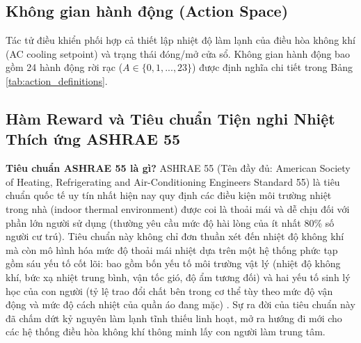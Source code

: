 \documentclass[12pt, a4paper]{report}
\begin{document}
\subsection{Không gian hành động (Action Space)}
Tác tử điều khiển phối hợp cả thiết lập nhiệt độ làm lạnh của điều hòa không khí (AC cooling setpoint) và trạng thái đóng/mở cửa sổ. Không gian hành động bao gồm 24 hành động rời rạc ($A \in \{0, 1, ..., 23\}$) được định nghĩa chi tiết trong Bảng \ref{tab:action_definitions}.

\begin{table}[H]
    \centering
    \caption{Định nghĩa chi tiết 24 hành động trong không gian hành động của tác tử}
    \label{tab:action_definitions}
    \vspace{0.2cm}
\end{table}

\subsection{Hàm Reward và Tiêu chuẩn Tiện nghi Nhiệt Thích ứng ASHRAE 55}
\textbf{Tiêu chuẩn ASHRAE 55 là gì?} 
ASHRAE 55 (Tên đầy đủ: American Society of Heating, Refrigerating and Air-Conditioning Engineers Standard 55) là tiêu chuẩn quốc tế uy tín nhất hiện nay quy định các điều kiện môi trường nhiệt trong nhà (indoor thermal environment) được coi là thoải mái và dễ chịu đối với phần lớn người sử dụng (thường yêu cầu mức độ hài lòng của ít nhất 80\% số người cư trú). Tiêu chuẩn này không chỉ đơn thuần xét đến nhiệt độ không khí mà còn mô hình hóa mức độ thoải mái nhiệt dựa trên một hệ thống phức tạp gồm sáu yếu tố cốt lõi: bao gồm bốn yếu tố môi trường vật lý (nhiệt độ không khí, bức xạ nhiệt trung bình, vận tốc gió, độ ẩm tương đối) và hai yếu tố sinh lý học của con người (tỷ lệ trao đổi chất bên trong cơ thể tùy theo mức độ vận động và mức độ cách nhiệt của quần áo đang mặc) \cite{ashrae55}. Sự ra đời của tiêu chuẩn này đã chấm dứt kỷ nguyên làm lạnh tĩnh thiếu linh hoạt, mở ra hướng đi mới cho các hệ thống điều hòa không khí thông minh lấy con người làm trung tâm.
\end{document}
